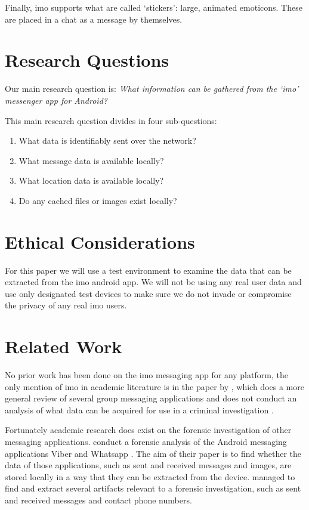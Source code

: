 \documentclass[conference]{IEEEtran}
\begin{document}
Finally, imo supports what are called `stickers': large, animated emoticons.
These are placed in a chat as a message by themselves.


\section{Research Questions}\label{sec:researchq}

Our main research question is:
{\it What information can be gathered from the `imo' messenger app for Android?}

This main research question divides in four sub-questions:

\begin{enumerate}
    \item What data is identifiably sent over the network?
    \item What message data is available locally?
    \item What location data is available locally?
    \item Do any cached files or images exist locally?
\end{enumerate}


\section{Ethical Considerations}\label{sec:ethics}

For this paper we will use a test environment to examine the data that can be
extracted from the imo android app. We will not be using any real user data and
use only designated test devices to make sure we do not invade or compromise the
privacy of any real imo users.


\section{Related Work}\label{sec:relwork}

No prior work has been done on the imo messaging app for any platform, the only
mention of imo in academic literature is in the paper by \citeauthor{zhu}, which
does a more general review of several group messaging applications and does not
conduct an analysis of what data can be acquired for use in a criminal
investigation \cite{zhu}.

Fortunately academic research does exist on the forensic investigation of other
messaging applications. \citeauthor{mahajan2013forensic} conduct a forensic
analysis of the Android messaging applications Viber and Whatsapp
\cite{mahajan2013forensic}. The aim of their paper is to find whether the data
of those applications, such as sent and received messages and images, are stored
locally in a way that they can be extracted from the device.
\citeauthor{mahajan2013forensic} managed to find and extract several artifacts
relevant to a forensic investigation, such as sent and received messages and
contact phone numbers.
\end{document}
